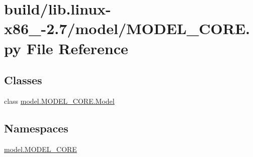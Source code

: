 \hypertarget{build_2lib_8linux-x86__64-2_87_2model_2MODEL__CORE_8py}{}\section{build/lib.linux-\/x86\+\_-\/2.7/model/\+M\+O\+D\+E\+L\+\_\+\+C\+O\+R\+E.py File Reference}
\label{build_2lib_8linux-x86__64-2_87_2model_2MODEL__CORE_8py}
\subsection*{Classes}
\begin{DoxyCompactItemize}
\item 
class \hyperlink{classmodel_1_1MODEL__CORE_1_1Model}{model.\+M\+O\+D\+E\+L\+\_\+\+C\+O\+R\+E.\+Model}
\end{DoxyCompactItemize}
\subsection*{Namespaces}
\begin{DoxyCompactItemize}
\item 
 \hyperlink{namespacemodel_1_1MODEL__CORE}{model.\+M\+O\+D\+E\+L\+\_\+\+C\+O\+R\+E}
\end{DoxyCompactItemize}
